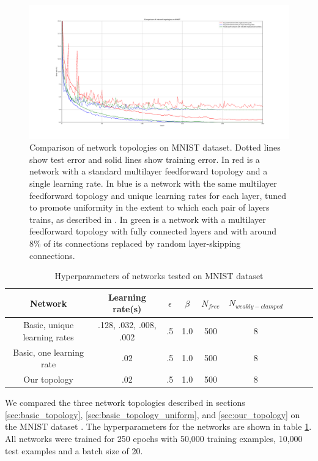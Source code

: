 \documentclass{article}
\begin{document}
\begin{figure}
  \centering
  \includegraphics[width=\textwidth]{figures/MNIST_network_comparison.pdf}
  \caption{Comparison of network topologies on MNIST dataset. Dotted lines show test error and solid lines show training error. In red is a network with a standard multilayer feedforward topology and a single learning rate. In blue is a network with the same multilayer feedforward topology and unique learning rates for each layer, tuned to promote uniformity in the extent to which each pair of layers trains, as described in \cite{scellier17}. In green is a network with a multilayer feedforward topology with fully connected layers and with around $8\%$ of its connections replaced by random layer-skipping connections.}
  \label{fig:mnist_comparison}
\end{figure}

\begin{table}
\begin{center}
\begin{tabular}{|c|c|c|c|c|c|c|c|c|}
\hline
Network & Learning rate(s) & $\epsilon$ & $\beta$ & $N_{free}$ & $N_{weakly-clamped}$\\\hline\hline
Basic, unique learning rates & .128, .032, .008, .002 & .5 & 1.0 & 500 & 8 \\\hline
Basic, one learning rate & .02 & .5 & 1.0 & 500 & 8  \\\hline
Our topology & .02 & .5 & 1.0 & 500 & 8 \\\hline
\end{tabular}
\end{center}
\caption{Hyperparameters of networks tested on MNIST dataset}
\label{table:hyperparameters}
\end{table}

We compared the three network topologies described in sections \ref{sec:basic_topology}, \ref{sec:basic_topology_uniform}, and \ref{sec:our_topology} on the MNIST dataset \cite{mnist1998}. The hyperparameters for the networks are shown in table \ref{table:hyperparameters}. All networks were trained for 250 epochs with 50,000 training examples, 10,000 test examples and a batch size of 20.
\end{document}
